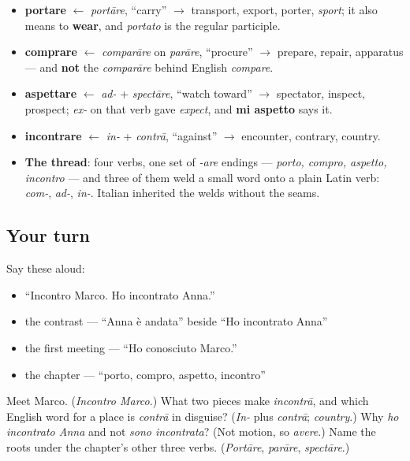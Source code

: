 \begin{grammarlens}[title={What you've built this chapter}]
\begin{itemize}
\raggedright
  \item \textbf{portare} $\leftarrow$ \emph{portāre}, \textquotedblleft{}carry\textquotedblright{} $\to$ transport, export, porter, \emph{sport}; it also means to \textbf{wear}, and \emph{portato} is the regular participle.
  \item \textbf{comprare} $\leftarrow$ \emph{comparāre} on \emph{parāre}, \textquotedblleft{}procure\textquotedblright{} $\to$ prepare, repair, apparatus — and \textbf{not} the \emph{comparāre} behind English \emph{compare}.
  \item \textbf{aspettare} $\leftarrow$ \emph{ad-} + \emph{spectāre}, \textquotedblleft{}watch toward\textquotedblright{} $\to$ spectator, inspect, prospect; \emph{ex-} on that verb gave \emph{expect}, and \textbf{mi aspetto} says it.
  \item \textbf{incontrare} $\leftarrow$ \emph{in-} + \emph{contrā}, \textquotedblleft{}against\textquotedblright{} $\to$ encounter, contrary, country.
  \item \textbf{The thread}: four verbs, one set of \emph{-are} endings — \emph{porto, compro, aspetto, incontro} — and three of them weld a small word onto a plain Latin verb: \emph{com-}, \emph{ad-}, \emph{in-}. Italian inherited the welds without the seams.
\end{itemize}
\end{grammarlens}

\subsection*{Your turn}
Say these aloud:

\begin{itemize}
\raggedright
  \item \textquotedblleft{}Incontro Marco. Ho incontrato Anna.\textquotedblright{}
  \item the contrast — \textquotedblleft{}Anna è andata\textquotedblright{} beside \textquotedblleft{}Ho incontrato Anna\textquotedblright{}
  \item the first meeting — \textquotedblleft{}Ho conosciuto Marco.\textquotedblright{}
  \item the chapter — \textquotedblleft{}porto, compro, aspetto, incontro\textquotedblright{}
\end{itemize}

\begin{tcolorbox}[breakable,colback=teal!4,colframe=teal!35!black,title={Before you move on}]
Meet Marco. (\emph{Incontro Marco}.) What two pieces make \emph{incontrā}, and which English word for a place is \emph{contrā} in disguise? (\emph{In-} plus \emph{contrā}; \emph{country}.) Why \emph{ho incontrato Anna} and not \emph{sono incontrata}? (Not motion, so \emph{avere}.) Name the roots under the chapter's other three verbs. (\emph{Portāre}, \emph{parāre}, \emph{spectāre}.)
\end{tcolorbox}

